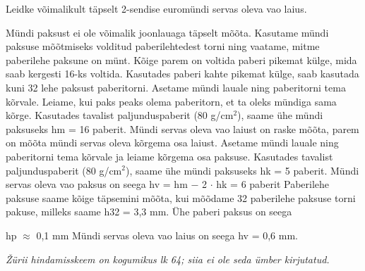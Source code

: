 
Leidke võimalikult täpselt 2-sendise euromündi servas oleva vao laius.

\hint

\solu
Mündi paksust ei ole võimalik joonlauaga täpselt mõõta. Kasutame mündi paksuse mõõtmiseks volditud paberilehtedest torni ning vaatame, mitme paberilehe paksune on münt. Kõige parem on voltida paberi pikemat külge, mida saab kergesti 16-ks voltida. Kasutades paberi kahte pikemat külge, saab kasutada kuni 32 lehe paksust paberitorni. Asetame mündi lauale ning paberitorni tema kõrvale. Leiame, kui paks peaks olema paberitorn, et ta oleks mündiga sama kõrge. Kasutades tavalist paljunduspaberit (80 g/cm$^2$), saame ühe mündi paksuseks hm = 16 paberit. Mündi servas oleva vao laiust on raske mõõta, parem on mõõta mündi servas oleva kõrgema osa laiust. Asetame mündi lauale ning paberitorni tema kõrvale ja leiame kõrgema osa paksuse. Kasutades tavalist paljunduspaberit (80 g/cm$^2$), saame ühe mündi paksuseks hk = 5 paberit. Mündi servas oleva vao paksus on seega hv = hm $-$ 2 $\cdot$ hk = 6 paberit Paberilehe paksuse saame kõige täpsemini mõõta, kui mõõdame 32 paberilehe paksuse torni pakuse, milleks saame h32 = 3,3 mm. Ühe paberi paksus on seega

hp $\approx$ 0,1 mm Mündi servas oleva vao laius on seega hv = 0,6 mm.

\textit{Žürii hindamisskeem on kogumikus lk 64; siia ei ole seda ümber kirjutatud.}
\probend
